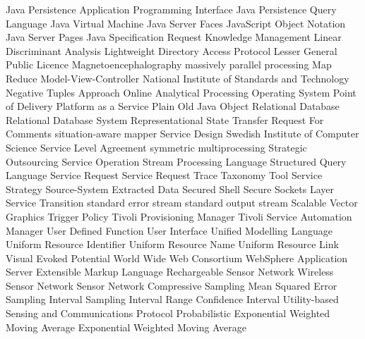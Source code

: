 \begin{acronym}[YTM]
  {Java Persistence Application Programming Interface}
 {Java Persistence Query Language}
  {Java Virtual Machine}
  {Java Server Faces}
 {JavaScript Object Notation}
  {Java Server Pages}
  {Java Specification Request}
   {Knowledge Management}
	{Linear Discriminant Analysis}
 {Lightweight Directory Access Protocol}
 {Lesser General Public Licence}
	{Magnetoencephalography}
	{massively parallel processing}
	{Map Reduce}
  {Model-View-Controller}
 {National Institute of Standards and Technology}
  {Negative Tuples Approach}
 {Online Analytical Processing} 
   {Operating System}
  {Point of Delivery}
 {Platform as a Service}
 {Plain Old Java Object}
  {Relational Database}
 {Relational Database System}
 {Representational State Transfer}
	{Request For Comments}
	{situation-aware mapper}
   {Service Design}
	{Swedish Institute of Computer Science}
  {Service Level Agreement}
	{symmetric multiprocessing}
	{Strategic Outsourcing}
  {Service Operation}
  {Stream Processing Language}
	{Structured Query Language}
   {Service Request}
 {Service Request Trace Taxonomy Tool}
   {Service Strategy}
 {Source-System Extracted Data}
  {Secured Shell}
  {Secure Sockets Layer}
   {Service Transition}
 {standard error stream}
 {standard output stream}
  {Scalable Vector Graphics}
   {Trigger Policy}
  {Tivoli Provisioning Manager}
 {Tivoli Service Automation Manager}
	{User Defined Function}
   {User Interface}
  {Unified Modelling Language}
  {Uniform Resource Identifier}
  {Uniform Resource Name}
  {Uniform Resource Link}
	{Visual Evoked Potential}
  {World Wide Web Consortium}
  {WebSphere Application Server}
  {Extensible Markup Language}
  {Rechargeable Sensor Network}
  {Wireless Sensor Network}
   {Sensor Network}
   {Compressive Sampling}
  {Mean Squared Error}
   {Sampling Interval}
  {Sampling Interval Range}
   {Confidence Interval}
 {Utility-based Sensing and Communications Protocol}
 {Probabilistic Exponential Weighted Moving Average}
 {Exponential Weighted Moving Average}
\end{acronym}